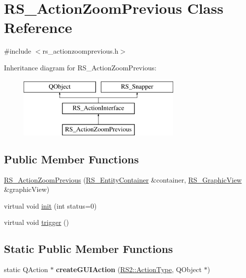 \hypertarget{classRS__ActionZoomPrevious}{\section{R\-S\-\_\-\-Action\-Zoom\-Previous Class Reference}
\label{classRS__ActionZoomPrevious}
}


{\ttfamily \#include $<$rs\-\_\-actionzoomprevious.\-h$>$}

Inheritance diagram for R\-S\-\_\-\-Action\-Zoom\-Previous\-:\begin{figure}[H]
\begin{center}
\leavevmode
\includegraphics[height=3.000000cm]{classRS__ActionZoomPrevious}
\end{center}
\end{figure}
\subsection*{Public Member Functions}
\begin{DoxyCompactItemize}
\item 
\hyperlink{classRS__ActionZoomPrevious_a7000bdad0e62076f1010b63fd10addcd}{R\-S\-\_\-\-Action\-Zoom\-Previous} (\hyperlink{classRS__EntityContainer}{R\-S\-\_\-\-Entity\-Container} \&container, \hyperlink{classRS__GraphicView}{R\-S\-\_\-\-Graphic\-View} \&graphic\-View)
\item 
virtual void \hyperlink{classRS__ActionZoomPrevious_aefcafcd92624f6d3253a35d9362ea4fa}{init} (int status=0)
\item 
virtual void \hyperlink{classRS__ActionZoomPrevious_a56c0a6270d195fae290d6abc8efcc695}{trigger} ()
\end{DoxyCompactItemize}
\subsection*{Static Public Member Functions}
\begin{DoxyCompactItemize}
\item 
\hypertarget{classRS__ActionZoomPrevious_ab5692392ea3a2814c52f2aaa88f13f71}{static Q\-Action $\ast$ {\bfseries create\-G\-U\-I\-Action} (\hyperlink{classRS2_afe3523e0bc41fd637b892321cfc4b9d7}{R\-S2\-::\-Action\-Type}, Q\-Object $\ast$)}\label{classRS__ActionZoomPrevious_ab5692392ea3a2814c52f2aaa88f13f71}

\end{DoxyCompactItemize}
